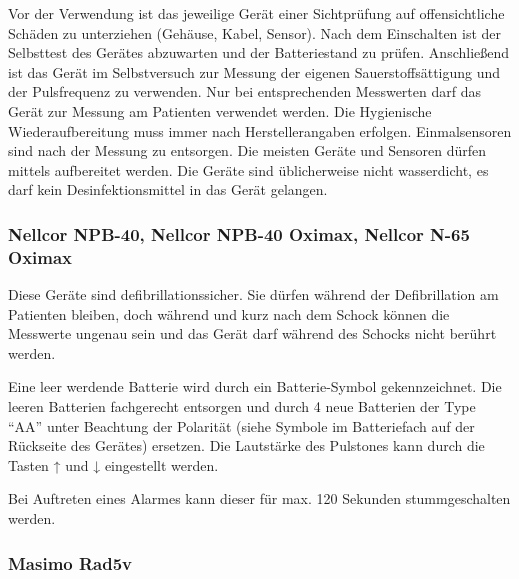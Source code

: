 {%
Vor der Verwendung ist das jeweilige Gerät einer Sichtprüfung auf offensichtliche Schäden zu
unterziehen (Gehäuse, Kabel, Sensor). Nach dem Einschalten ist der Selbsttest des Gerätes
abzuwarten und der Batteriestand zu prüfen. Anschließend ist das Gerät im Selbstversuch zur
Messung der eigenen Sauerstoffsättigung und der Pulsfrequenz zu verwenden. Nur bei
entsprechenden Messwerten darf das Gerät zur Messung am Patienten verwendet werden.
}{}{}{}{}
{
Die Hygienische Wiederaufbereitung muss immer nach Herstellerangaben erfolgen.
Einmalsensoren sind nach der Messung zu entsorgen.
Die meisten Geräte und Sensoren dürfen mittels  aufbereitet werden. Die Geräte sind üblicherweise
nicht wasserdicht, es darf kein Desinfektionsmittel in das Gerät gelangen. 
}{}{}{}{}

{%
{\TakeNotesLarge}
}{}{}{}{}

\subsubsection{Nellcor NPB-40, Nellcor NPB-40 Oximax, Nellcor N-65 Oximax}

 


Diese Geräte sind  defibrillationssicher. Sie dürfen während der
Defibrillation am Patienten bleiben, doch während und kurz nach dem Schock können
die Messwerte ungenau sein und das Gerät darf während des Schocks nicht berührt
werden.

Eine leer werdende Batterie wird durch ein Batterie-Symbol gekennzeichnet. Die
leeren Batterien fachgerecht entsorgen und durch 4 neue Batterien der Type "`AA"'
unter Beachtung der Polarität (siehe Symbole im Batteriefach auf der Rückseite
des Gerätes) ersetzen. Die Lautstärke des Pulstones kann durch die Tasten ↑ und ↓
eingestellt werden.

Bei Auftreten eines Alarmes kann dieser für max. 120 Sekunden 
stummgeschalten werden.




\subsubsection{Masimo Rad5v}

